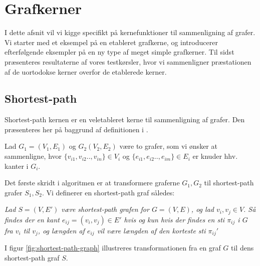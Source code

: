 \documentclass{article}
\begin{document}
\section{Grafkerner}
I dette afsnit vil vi kigge specifikt på kernefunktioner til sammenligning af grafer. Vi starter med et eksempel på en etableret grafkerne, og introducerer efterfølgende eksempler på en ny type af meget simple grafkerner. Til sidst præsenteres resultaterne af vores testkørsler, hvor vi sammenligner præstationen af de uortodokse kerner overfor de etablerede kerner.

\subsection{Shortest-path}
Shortest-path kernen er en veletableret kerne til sammenligning af grafer. Den præsenteres her på baggrund af definitionen i \cite{shortest-path}. 

Lad $G_1=(V_1,E_1)$ og $G_2(V_2,E_2)$ være to grafer, som vi ønsker at sammenligne, hvor $\{v_{i1},v_{i2}..,v_{in}\}\in V_i$ og $\{e_{i1},e_{i2}..,e_{im}\}\in E_i$ er knuder hhv. kanter i $G_i$.

Det første skridt i algoritmen er at transformere graferne $G_1,G_2$ til shortest-path grafer $S_1,S_2$. Vi definerer en shortest-path graf således:

\textit{Lad $S=(V,E')$ være shortest-path grafen for $G=(V,E)$, og lad $v_i,v_j\in V$. Så findes der en kant $e_{ij}=(v_i,v_j)\in E'$ hvis og kun hvis der findes en sti $\pi_{ij}$ i $G$ fra $v_i$ til $v_j$, og længden af $e_{ij}$ vil være længden af den korteste sti $\pi_{ij}'$}

I figur \ref{fig:shortest-path-graph} illustreres transformationen fra en graf $G$ til dens shortest-path graf $S$.
\end{document}
